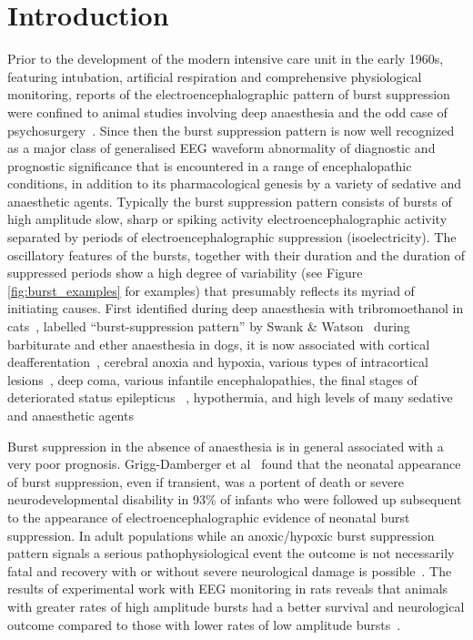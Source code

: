 \documentclass[a4paper,12pt]{article}
\begin{document}
\section{Introduction}
Prior to the development of the modern intensive care unit in the early
1960s, featuring intubation, artificial respiration and comprehensive
physiological monitoring, reports of the electroencephalographic
pattern of burst suppression were confined to animal studies involving
deep anaesthesia and the odd case of psychosurgery~\cite{Niedermeyer2009}. Since then the burst suppression pattern is now well recognized as
a major class of generalised EEG waveform abnormality of diagnostic
and prognostic significance that is encountered in a range of
encephalopathic conditions, in addition to its pharmacological genesis
by a variety of sedative and anaesthetic agents. Typically the burst
suppression pattern consists of bursts of high amplitude slow, sharp or
spiking activity electroencephalographic activity separated by periods
of electroencephalographic suppression (isoelectricity). The oscillatory
features of the bursts, together with their duration and the duration of
suppressed periods show a high degree of variability (see Figure \ref{fig:burst_examples} for examples) that presumably reflects its
myriad of initiating causes. First identified
during deep anaesthesia with tribromoethanol in cats~\cite{Derbyshire31071936}, labelled “burst-suppression pattern” by Swank \& Watson~\cite{Swank01031949} during barbiturate and ether anaesthesia in dogs,
it is now
associated with cortical deafferentation~\cite{Henry19521},
cerebral anoxia and hypoxia, various types of intracortical lesions~\cite{FischerWilliams1963568}, deep coma, various infantile
encephalopathies, the final stages of deteriorated status epilepticus~\cite{Treiman199049}
, hypothermia, and high levels of many sedative
and anaesthetic agents~\cite{Schwartz1989}~\cite{Akrawi1996}

Burst suppression in the absence of anaesthesia is in general
associated with a very poor prognosis. Grigg-Damberger et al~\cite{GriggDamberger198984}
found that the neonatal appearance of burst suppression, even if
transient, was a portent of death or severe neurodevelopmental
disability in 93\% of infants who were followed up subsequent to the
appearance of electroencephalographic evidence of neonatal burst
suppression. In adult populations while an anoxic/hypoxic burst
suppression pattern signals a serious pathophysiological event the
outcome is not necessarily fatal and recovery with or without severe
neurological damage is possible~\cite{Niedermeyer2009}. The results of
experimental work with EEG monitoring in rats reveals that animals with
greater rates of high amplitude bursts had a better survival and
neurological outcome compared to those with lower rates of low
amplitude bursts~\cite{Geocadin2002193}.
\end{document}
